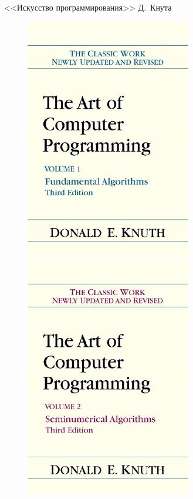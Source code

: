 \documentclass{beamer}
\begin{document}
\begin{frame}{<<Искусство программирования>> Д.~Кнута}
\begin{figure}
\begin{minipage}[h]{0.3\linewidth}
                \includegraphics[width=0.8\linewidth]{fig/TAoP1.jpg}
            \end{minipage}
            \begin{minipage}[h]{0.33\linewidth}
                \includegraphics[width=0.8\linewidth]{fig/TAoP2.jpg}

\end{minipage}
\end{figure}
\end{frame}
\end{document}
